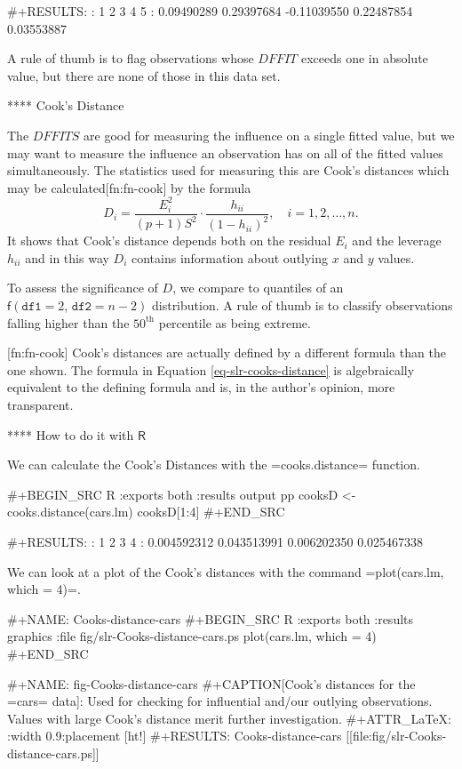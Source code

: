 #+RESULTS:
:           1           2           3           4           5 
:  0.09490289  0.29397684 -0.11039550  0.22487854  0.03553887

A rule of thumb is to flag observations whose \(DFFIT\) exceeds one in
absolute value, but there are none of those in this data set.

**** Cook's Distance

The \(DFFITS\) are good for measuring the influence on a single fitted
value, but we may want to measure the influence an observation has on
all of the fitted values simultaneously. The statistics used for
measuring this are Cook's distances which may be
calculated[fn:fn-cook] by the formula
\begin{equation}
\label{eq-slr-cooks-distance}
D_{i}=\frac{E_{i}^{2}}{(p+1)S^{2}}\cdot\frac{h_{ii}}{(1-h_{ii})^{2}},\quad i=1,2,\ldots,n.
\end{equation}
It shows that Cook's distance depends both on the residual \(E_{i}\)
and the leverage \(h_{ii}\) and in this way \(D_{i}\) contains
information about outlying \(x\) and \(y\) values.

To assess the significance of \(D\), we compare to quantiles of an
\(\mathsf{f}(\mathtt{df1}=2,\,\mathtt{df2}=n-2)\) distribution. A rule
of thumb is to classify observations falling higher than the
\(50^{\mathrm{th}}\) percentile as being extreme.

[fn:fn-cook] Cook's distances are actually defined by a different
formula than the one shown. The formula in Equation
\eqref{eq-slr-cooks-distance} is algebraically equivalent to the
defining formula and is, in the author's opinion, more transparent.

**** How to do it with \(\mathsf{R}\)

We can calculate the Cook's Distances with the =cooks.distance=
function.

#+BEGIN_SRC R :exports both :results output pp 
cooksD <- cooks.distance(cars.lm)
cooksD[1:4]
#+END_SRC

#+RESULTS:
:           1           2           3           4 
: 0.004592312 0.043513991 0.006202350 0.025467338

We can look at a plot of the Cook's distances with the command
=plot(cars.lm, which = 4)=.

#+NAME: Cooks-distance-cars
#+BEGIN_SRC R :exports both :results graphics :file fig/slr-Cooks-distance-cars.ps
plot(cars.lm, which = 4)
#+END_SRC

#+NAME: fig-Cooks-distance-cars
#+CAPTION[Cook's distances for the =cars= data]: \small Used for checking for influential and/our outlying observations. Values with large Cook's distance merit further investigation.
#+ATTR_LaTeX: :width 0.9\textwidth :placement [ht!]
#+RESULTS: Cooks-distance-cars
[[file:fig/slr-Cooks-distance-cars.ps]]

